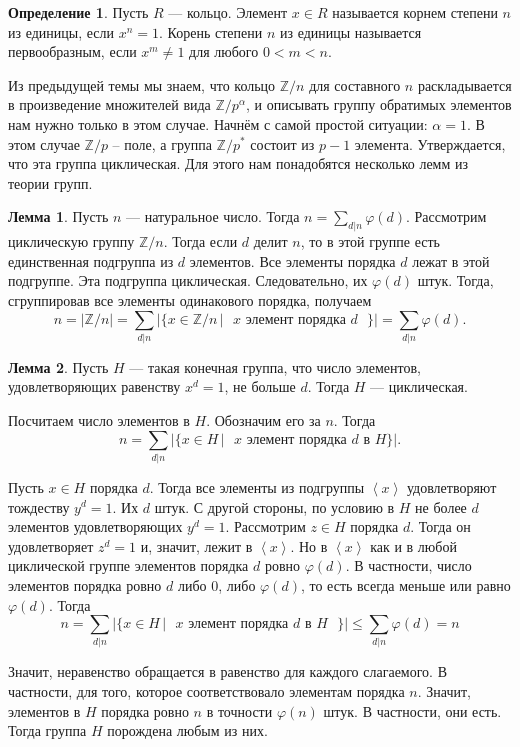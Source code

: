 \documentclass[10pt,a4paper,oneside]{book}
\theoremstyle{definition}
\newtheorem*{defn}{\color{yellow!30!red} Определение}
\newtheorem{lem}{\color{green!50!black}Лемма}
\renewcommand{\leq}{\leqslant}
\newcommand{\mb}[1]{\mathbb{#1}}
\def\ffi{\varphi}
\def\lan{\left\langle }
\def\ran{\right\rangle}
\def\dfn{\begin{defn}}
\def\edfn{\end{defn}}
\def\lm{\begin{lem}}
\def\elm{\end{lem}}
\begin{document}
\dfn Пусть $R$ --- кольцо. Элемент $x\in R$ называется корнем степени $n$ из единицы, если $x^n=1$. Корень
степени $n$ из единицы называется первообразным, если $x^m\neq 1$ для любого $0<m<n$.
\edfn




Из предыдущей темы мы знаем, что кольцо $\mb Z/n$ для составного $n$ раскладывается в произведение множителей вида $\mb Z/p^{\alpha}$, и описывать группу обратимых элементов нам нужно только в этом случае. Начнём с самой простой ситуации: $\alpha=1$. В этом случае $\mb Z/p$ -- поле, а группа $\mb Z/p^*$ состоит из $p-1$ элемента. Утверждается, что эта группа циклическая. Для этого нам понадобятся несколько лемм из теории групп. 

\lm Пусть $n$ --- натуральное число. Тогда $n = \sum_{d|n}\varphi(d)$.
\proof  Рассмотрим циклическую группу $\mb Z/n$. Тогда если $d$ делит $n$, то в этой группе есть единственная подгруппа из $d$ элементов. Все элементы порядка $d$ лежат в этой подгруппе. Эта подгруппа циклическая. Следовательно, их $\ffi(d)$ штук. Тогда, сгруппировав все элементы одинакового порядка, получаем
$$n= |\mb Z/n |= \sum_{d|n} |\{ x \in \mb Z/n \,| \text{ $x$ элемент порядка $d$  }\}| = \sum_{d|n}\varphi(d).$$
\endproof
\elm

\lm Пусть $H$ --- такая конечная группа, что число элементов, удовлетворяющих равенству $x^d= 1$, не больше $d$. Тогда $H$ --- циклическая.
\elm
\proof Посчитаем число элементов в $H$. Обозначим его за $n$. Тогда
$$ n = \sum_{d|n} |\{ x \in H \,|\text{  $x$ элемент порядка $d$ в $H$} \}|.$$

Пусть  $x\in H$ порядка $d$. Тогда все элементы из подгруппы $\lan x \ran$ удовлетворяют тождеству $y^d=1$. Их $d$ штук. С другой стороны, по условию в $H$ не более $d$ элементов удовлетворяющих $y^d=1$. Рассмотрим $z \in H$ порядка $d$. Тогда он удовлетворяет $z^d=1$ и, значит, лежит в $\lan x \ran$. Но в $\lan x \ran$ как и в любой циклической группе элементов порядка $d$ ровно $\ffi(d)$. В частности, число элементов порядка ровно $d$ либо $0$, либо $\varphi(d)$, то есть всегда меньше или равно $\varphi(d)$. Тогда
$$n = \sum_{d|n} |\{x \in H \,| \text{  $x$ элемент порядка $d$ в $H$ } \}|\leq \sum_{d|n}\varphi(d) =n$$

Значит, неравенство обращается в равенство для каждого слагаемого. В частности, для того, которое соответствовало элементам порядка $n$. Значит, элементов в $H$ порядка ровно $n$ в точности $\varphi(n)$ штук. В частности, они
есть. Тогда группа $H$ порождена любым из них.\endproof
\end{document}
